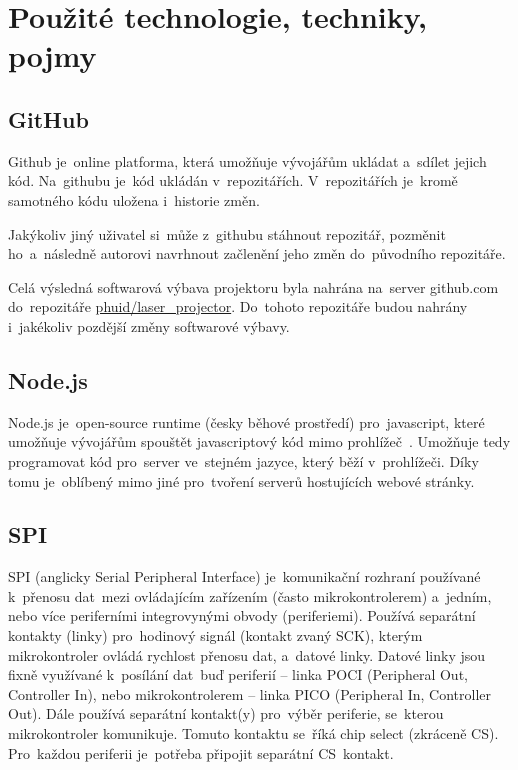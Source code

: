 \chapter{Použité technologie, techniky, pojmy}
\section{GitHub}
Github je~online platforma, která umožňuje vývojářům ukládat a~sdílet jejich kód. Na~githubu je~kód ukládán v~repozitářích. V~repozitářích je~kromě samotného kódu uložena i~historie změn.

Jakýkoliv jiný uživatel si~může z~githubu stáhnout repozitář, pozměnit ho~a~následně autorovi navrhnout začlenění jeho změn do~původního repozitáře.

Celá výsledná softwarová výbava projektoru byla nahrána na~server github.com do~repozitáře \href{https://github.com/phuid/laser_projector}{phuid/laser\_projector}. Do~tohoto repozitáře budou nahrány i~jakékoliv pozdější změny softwarové výbavy.

\section{Node.js}
Node.js je~open-source runtime (česky běhové prostředí) pro~javascript, které umožňuje vývojářům spouštět javascriptový kód mimo prohlížeč~\cite{nodejs-wiki}.
Umožňuje tedy programovat kód pro~server ve~stejném jazyce, který běží v~prohlížeči. Díky tomu je~oblíbený mimo jiné pro~tvoření serverů hostujících webové stránky.

\section{SPI}\label{sec:spi}
SPI (anglicky Serial Peripheral Interface) je~komunikační rozhraní používané k~přenosu dat~mezi ovládajícím zařízením (často mikrokontrolerem) a~jedním, nebo více periferními integrovynými obvody (periferiemi).
Používá separátní kontakty (linky) pro~hodinový signál (kontakt zvaný SCK), kterým mikrokontroler ovládá rychlost přenosu dat, a~datové linky.
Datové linky jsou fixně využívané k~posílání dat~buď periferií -- linka POCI (Peripheral Out, Controller In), nebo mikrokontrolerem -- linka PICO (Peripheral In, Controller Out).
Dále používá separátní kontakt(y) pro~výběr periferie, se~kterou mikrokontroler komunikuje. Tomuto kontaktu se~říká chip select (zkráceně CS). Pro~každou periferii je~potřeba připojit separátní CS~kontakt.~\cite{sparkfun-spi}

